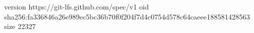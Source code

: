 version https://git-lfs.github.com/spec/v1
oid sha256:fa336846a26e989ec5bc36b70f0f204f7d4c0754d578c64caeee188581428563
size 22327
